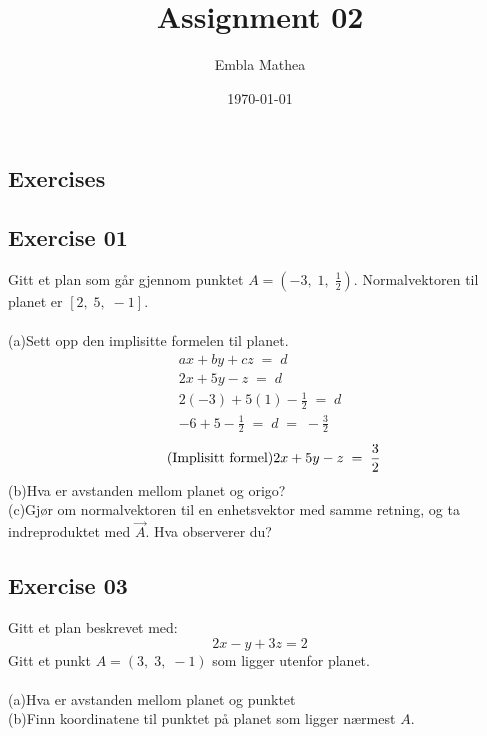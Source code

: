 \documentclass[12pt, a4paper]{article}
\title{Assignment 02}
\author{Embla Mathea}
\date{\today}
\begin{document}
\maketitle

\begin{center}
	\section*{Exercises}
\end{center}

\subsection*{Exercise 01}
Gitt et plan som går gjennom punktet
$A=\left(-3,\;1,\;\frac{1}{2}\right)$.
Normalvektoren til planet er $\left[2,\;5,\;-1\right]$.\\\\		
	(a)\quad Sett opp den implisitte formelen til planet.
			\begin{gather}
				\tag*{}
					ax+by+cz\;=\;d\\
				\tag*{}
					2x+5y-z\;=\;d\\
				\tag*{}
					2(-3)+5(1)-\frac{1}{2}\;=\;d\\
				\tag*{}
					-6+5-\frac{1}{2}\;=\;d\;=\;-\frac{3}{2}
			\end{gather}
			\begin{equation}
				\tag{Implisitt formel}
					2x+5y-z\;=\;\frac{3}{2}\\
			\end{equation}
	(b)\quad Hva er avstanden mellom planet og origo?
			\begin{equation}
				\tag*{}
			\end{equation}
	(c)\quad Gjør om normalvektoren til en enhetsvektor
	med samme retning, og ta indreproduktet med $\vec{A}$.
	Hva observerer du?
			\begin{equation}
				\tag*{}
			\end{equation}
			
\subsection*{Exercise 03}
Gitt et plan beskrevet med:
	\begin{equation}
		\tag*{}
		2x-y+3z=2
	\end{equation}
Gitt et punkt $A=(3,\;3,\;-1)$ som ligger utenfor planet.\\\\
	(a)\quad Hva er avstanden mellom planet og punktet
			\begin{equation}
				\tag*{}
			\end{equation}
	(b)\quad Finn koordinatene til punktet på planet som
	ligger nærmest $A$.
			\begin{equation}
				\tag*{}			
			\end{equation}
			
\end{document}
